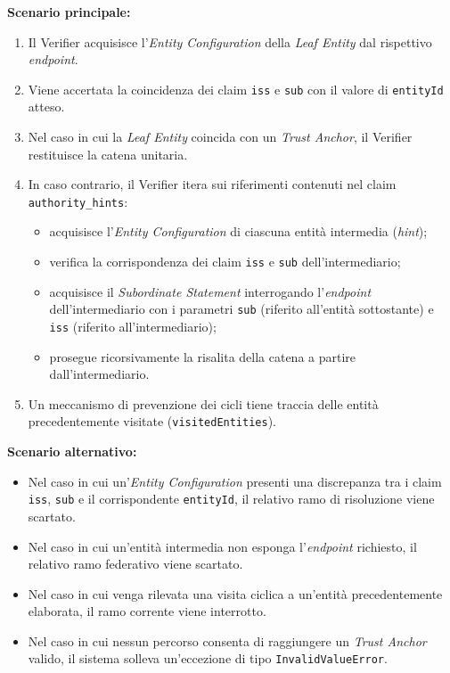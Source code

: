 \noindent\textbf{Scenario principale:}
\begin{enumerate}
    \item Il Verifier acquisisce l'\textit{Entity Configuration} della \textit{Leaf Entity} dal rispettivo \textit{endpoint}.
    \item Viene accertata la coincidenza dei claim \texttt{iss} e \texttt{sub} con il valore di \texttt{entityId} atteso.
    \item Nel caso in cui la \textit{Leaf Entity} coincida con un \textit{Trust Anchor}, il Verifier restituisce la catena unitaria.
    \item In caso contrario, il Verifier itera sui riferimenti contenuti nel claim \texttt{authority\_\allowbreak{}hints}:
    \begin{itemize}
        \item acquisisce l'\textit{Entity Configuration} di ciascuna entità intermedia (\textit{hint});
        \item verifica la corrispondenza dei claim \texttt{iss} e \texttt{sub} dell'intermediario;
        \item acquisisce il \textit{Subordinate Statement} interrogando l'\textit{endpoint} dell'intermediario con i parametri \texttt{sub} (riferito all'entità sottostante) e \texttt{iss} (riferito all'intermediario);
        \item prosegue ricorsivamente la risalita della catena a partire dall'intermediario.
    \end{itemize}
    \item Un meccanismo di prevenzione dei cicli tiene traccia delle entità precedentemente visitate (\texttt{visitedEntities}).
\end{enumerate}

\noindent\textbf{Scenario alternativo:}
\begin{itemize}
    \item Nel caso in cui un'\textit{Entity Configuration} presenti una discrepanza tra i claim \texttt{iss}, \texttt{sub} e il corrispondente \texttt{entityId}, il relativo ramo di risoluzione viene scartato.
    \item Nel caso in cui un'entità intermedia non esponga l'\textit{endpoint} richiesto, il relativo ramo federativo viene scartato.
    \item Nel caso in cui venga rilevata una visita ciclica a un'entità precedentemente elaborata, il ramo corrente viene interrotto.
    \item Nel caso in cui nessun percorso consenta di raggiungere un \textit{Trust Anchor} valido, il sistema solleva un'eccezione di tipo \texttt{InvalidValueError}.
\end{itemize}

